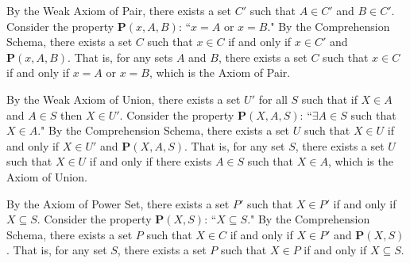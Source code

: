 \documentclass[class=report, crop=false]{standalone}
\begin{document}
  \begin{solution}
    By the Weak Axiom of Pair, there exists a set \(C'\) such that \(A \in C'\) and \(B \in C'\). Consider the property \(\textbf{P}(x, A, B)\): ``\(x = A\) or \(x = B\)." By the Comprehension Schema, there exists a set \(C\) such that \(x \in C\) if and only if \(x \in C'\) and \(\textbf{P}(x, A, B)\).
    That is, for any sets \(A\) and \(B\), there exists a set \(C\) such that \(x \in C\) if and only if \(x = A\) or \(x = B\), which is the Axiom of Pair.

    By the Weak Axiom of Union, there exists a set \(U'\) for all \(S\) such that if \(X \in A\) and \(A \in S\) then \(X \in U'\). Consider the property \(\textbf{P}(X, A, S)\): ``\(\exists A \in S\) such that \(X \in A\)." By the Comprehension Schema, there exists a set \(U\) such that \(X \in U\) if and only if \(X \in U'\) and \(\textbf{P}(X, A, S)\).
    That is, for any set \(S\), there exists a set \(U\) such that \(X \in U\) if and only if there exists \(A \in S\) such that \(X \in A\), which is the Axiom of Union.

    By the Axiom of Power Set, there exists a set \(P'\) such that \(X \in P'\) if and only if \(X \subseteq S\). Consider the property \(\textbf{P}(X, S)\): ``\(X \subseteq S\)." By the Comprehension Schema, there exists a set \(P\) such that \(X \in C\) if and only if \(X \in P'\) and \(\textbf{P}(X, S)\).
    That is, for any set \(S\), there exists a set \(P\) such that \(X \in P\) if and only if \(X \subseteq S\).
  \end{solution}
\end{document}
